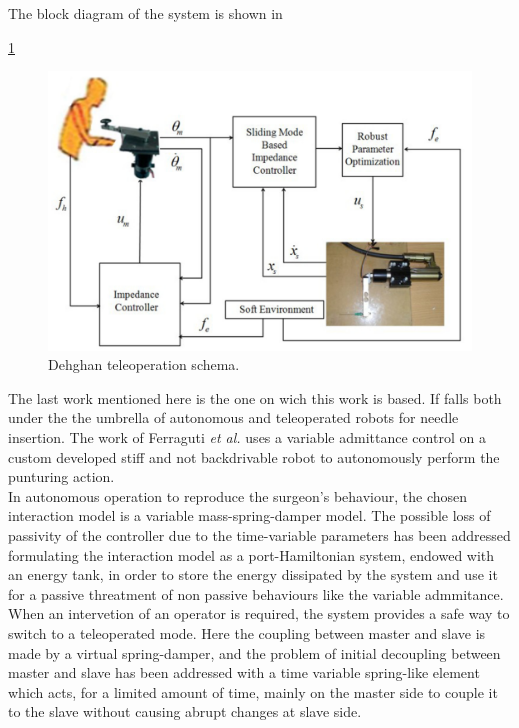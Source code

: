 The block diagram of the system is shown in \figurename{ \ref{fig:sliding_teleop}
\begin{figure}[h]
	\includegraphics[width=\textwidth]{images/sliding_teleop.png}
	\caption[Haptic teleoperation schema (Dehghan)]{Dehghan teleoperation schema.  \cite{Dehghan2011}}
	\label{fig:sliding_teleop}
\end{figure}

The last work mentioned here is the one on wich this work is based. If falls both under the the umbrella of autonomous and teleoperated robots for needle insertion.
The work of Ferraguti \textit{et al.} \cite{Ferraguti2015} uses a variable admittance control on a custom developed stiff and not backdrivable robot to autonomously perform the punturing action.\\
In autonomous operation to reproduce the surgeon's behaviour, the chosen interaction model is a variable mass-spring-damper model. The possible loss of passivity of the controller due to the time-variable parameters has been addressed formulating the interaction model as a port-Hamiltonian system, endowed with an energy tank, in order to store the energy dissipated by the system and use it for a passive threatment of non passive behaviours like the variable admmitance.\\
When an intervetion of an operator is required, the system provides a safe way to switch to a teleoperated mode.
Here the coupling between master and slave is made by a virtual spring-damper, and the problem of initial decoupling between master and slave has been addressed with a time variable spring-like element which acts, for a limited amount of time, mainly on the master side to couple it to the slave without causing abrupt changes at slave side.

}
